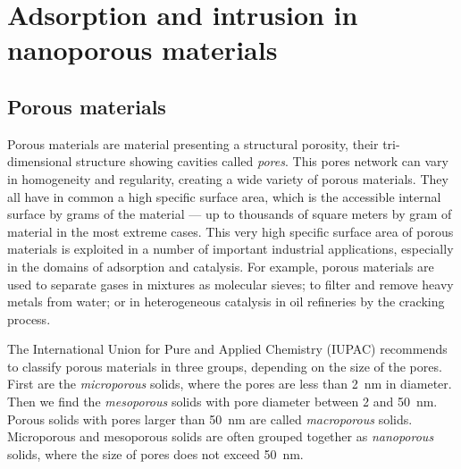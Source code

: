 \documentclass[thesis]{subfiles}
\begin{document}
\chapter{Adsorption and intrusion in nanoporous materials}

\section{Porous materials}

Porous materials are material presenting a structural porosity, their
tri-dimensional structure showing cavities called \emph{pores}. This pores
network can vary in homogeneity and regularity, creating a wide variety of
porous materials. They all have in common a high specific surface area, which is
the accessible internal surface by grams of the material --- up to thousands of
square meters by gram of material\cite{Farha2012} in the most extreme cases.
This very high specific surface area of porous materials is exploited in a
number of important industrial applications, especially in the domains of
adsorption and catalysis. For example, porous materials are used to separate
gases in mixtures as molecular sieves; to filter and remove heavy metals from
water; or in heterogeneous catalysis in oil refineries by the cracking process.

The International Union for Pure and Applied Chemistry (IUPAC) recommends to
classify porous materials in three groups, depending on the size of the
pores\cite{Rouquerol1994}. First are the \emph{microporous} solids, where the
pores are less than \SI{2}{nm} in diameter. Then we find the \emph{mesoporous}
solids with pore diameter between 2 and \SI{50}{nm}. Porous solids with pores
larger than \SI{50}{nm} are called \emph{macroporous} solids. Microporous and
mesoporous solids are often grouped together as \emph{nanoporous} solids, where
the size of pores does not exceed \SI{50}{nm}.
\end{document}
